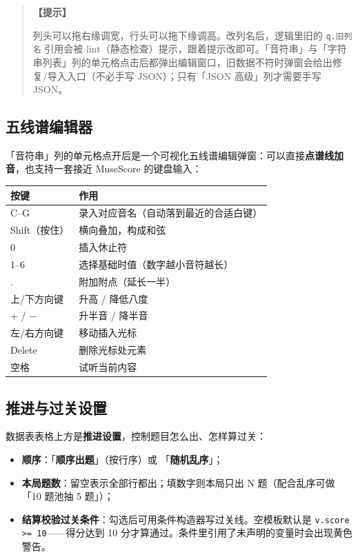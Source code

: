 \documentclass[UTF8,a4paper,zihao=-4]{ctexart}
\newcommand{\code}[1]{\texttt{#1}}   %
\newcommand{\ui}[1]{「\textbf{#1}」}  %
\newenvironment{tip}[1][提示]{%
  \begin{quote}\small\textbf{【#1】}\ignorespaces
}{\end{quote}}
\begin{document}
\begin{tip}
列头可以拖右缘调宽，行头可以拖下缘调高。改列名后，逻辑里旧的 \code{q.旧列名} 引用会被 lint（静态检查）提示，跟着提示改即可。「音符串」与「字符串列表」列的单元格点击后都弹出编辑窗口，旧数据不符时弹窗会给出修复/导入入口（不必手写 JSON）；只有「JSON 高级」列才需要手写 JSON。
\end{tip}

\subsection{五线谱编辑器}

「音符串」列的单元格点开后是一个可视化五线谱编辑弹窗：可以直接\textbf{点谱线加音}，也支持一套接近 MuseScore 的键盘输入：

\begin{center}
\begin{tabular}{ll}
\toprule
按键 & 作用 \\
\midrule
C--G & 录入对应音名（自动落到最近的合适白键） \\
Shift（按住） & 横向叠加，构成和弦 \\
0 & 插入休止符 \\
1--6 & 选择基础时值（数字越小音符越长） \\
. & 附加附点（延长一半） \\
上/下方向键 & 升高 / 降低八度 \\
+ / $-$ & 升半音 / 降半音 \\
左/右方向键 & 移动插入光标 \\
Delete & 删除光标处元素 \\
空格 & 试听当前内容 \\
\bottomrule
\end{tabular}
\end{center}

\subsection{推进与过关设置}

数据表表格上方是\textbf{推进设置}，控制题目怎么出、怎样算过关：

\begin{itemize}[nosep]
  \item \textbf{顺序}：\ui{顺序出题}（按行序）或 \ui{随机乱序}；
  \item \textbf{本局题数}：留空表示全部行都出；填数字则本局只出 N 题（配合乱序可做「10 题池抽 5 题」）；
  \item \textbf{结算校验过关条件}：勾选后可用条件构造器写过关线。空模板默认是 \code{v.score >= 10}——得分达到 10 分才算通过。条件里引用了未声明的变量时会出现黄色警告。
\end{itemize}
\end{document}
